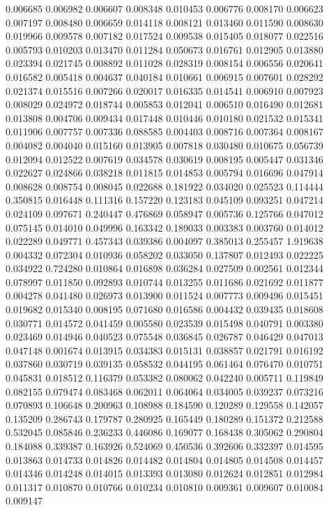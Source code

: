 0.006685
0.006982
0.006607
0.008348
0.010453
0.006776
0.008170
0.006623
0.007197
0.008480
0.006659
0.014118
0.008121
0.013460
0.011590
0.008630
0.019966
0.009578
0.007182
0.017524
0.009538
0.015405
0.018077
0.022516
0.005793
0.010203
0.013470
0.011284
0.050673
0.016761
0.012905
0.013880
0.023394
0.021745
0.008892
0.011028
0.028319
0.008154
0.006556
0.020641
0.016582
0.005418
0.004637
0.040184
0.010661
0.006915
0.007601
0.028292
0.021374
0.015516
0.007266
0.020017
0.016335
0.014541
0.006910
0.007923
0.008029
0.024972
0.018744
0.005853
0.012041
0.006510
0.016490
0.012681
0.013808
0.004706
0.009434
0.017448
0.010446
0.010180
0.021532
0.015341
0.011906
0.007757
0.007336
0.088585
0.004403
0.008716
0.007364
0.008167
0.004082
0.004040
0.015160
0.013905
0.007818
0.030480
0.010675
0.056739
0.012094
0.012522
0.007619
0.034578
0.030619
0.008195
0.005447
0.031346
0.022627
0.024866
0.038218
0.011815
0.014853
0.005794
0.016696
0.047914
0.008628
0.008754
0.008045
0.022688
0.181922
0.034020
0.025523
0.114444
0.350815
0.016448
0.111316
0.157220
0.123183
0.045109
0.093251
0.047214
0.024109
0.097671
0.240447
0.476869
0.058947
0.005736
0.125766
0.047012
0.075145
0.014010
0.049996
0.163342
0.189033
0.003383
0.003760
0.014012
0.022289
0.049771
0.457343
0.039386
0.004097
0.385013
0.255457
1.919638
0.004332
0.072304
0.010936
0.058202
0.033050
0.137807
0.012493
0.022225
0.034922
0.724280
0.010864
0.016898
0.036284
0.027509
0.002561
0.012344
0.078997
0.011850
0.092893
0.010744
0.013255
0.011686
0.021692
0.011877
0.004278
0.041480
0.026973
0.013900
0.011524
0.007773
0.009496
0.015451
0.019682
0.015340
0.008195
0.071680
0.016586
0.004432
0.039435
0.018608
0.030771
0.014572
0.041459
0.005580
0.023539
0.015498
0.040791
0.003380
0.023469
0.014946
0.040523
0.075548
0.036845
0.026787
0.046429
0.047013
0.047148
0.001674
0.013915
0.034383
0.015131
0.038857
0.021791
0.016192
0.037860
0.030719
0.039135
0.058532
0.044195
0.061464
0.076470
0.010751
0.045831
0.018512
0.116379
0.053382
0.080062
0.042240
0.005711
0.119849
0.082155
0.079474
0.083468
0.062011
0.064064
0.034005
0.039237
0.073216
0.070893
0.106648
0.200963
0.108988
0.184590
0.120289
0.129558
0.142057
0.135209
0.286743
0.179787
0.280925
0.165449
0.180289
0.151372
0.212588
0.532045
0.085846
0.236233
0.446086
0.169077
0.168438
0.305062
0.290804
0.184088
0.339387
0.163926
0.524069
0.450536
0.392606
0.332397
0.014595
0.013863
0.014733
0.014826
0.014482
0.014804
0.014805
0.014508
0.014457
0.014346
0.014248
0.014015
0.013393
0.013080
0.012624
0.012851
0.012984
0.011317
0.010870
0.010766
0.010234
0.010810
0.009361
0.009607
0.010084
0.009147
